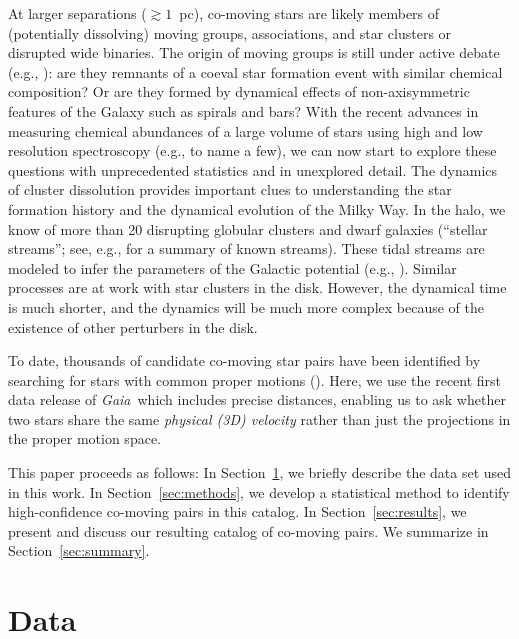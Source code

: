 \documentclass[manuscript, letterpaper]{aastex6}
\newcommand{\project}[1]{\textsl{#1}}
\newcommand{\gaia}{\project{Gaia}}
\newcommand{\sectionname}{Section}
\begin{document}
At larger separations ($\gtrsim 1$~pc), co-moving stars are likely members of
(potentially dissolving) moving groups, associations, and star clusters or
disrupted wide binaries.
The origin of moving groups is still under active debate (e.g., \citealt{Bovy:2010aa}):
are they remnants of a coeval
star formation event with similar chemical composition? Or are they formed by
dynamical effects of non-axisymmetric features of the Galaxy such as spirals
and bars? With the recent advances in measuring chemical abundances of
a large volume of stars using high and low resolution spectroscopy
(e.g., \citealt{Steinmetz:2006aa,Majewski:2015aa,Gilmore:2012aa} to name a few),
we can now start to explore these questions
with unprecedented statistics and in unexplored detail.
The dynamics of cluster dissolution provides important clues to understanding
the star formation history and the dynamical evolution of the Milky Way.
In the halo, we know of more than 20 disrupting globular clusters and dwarf galaxies
(``stellar streams''; see, e.g., \citealt{Grillmair:2016} for a summary of known streams).
These tidal streams are modeled to infer the parameters of the Galactic
potential (e.g., \citealt{Kupper:2015}).
Similar processes are at work with star clusters in the disk.
However, the dynamical time is much shorter, and the dynamics will be much more
complex because of the existence of other perturbers in the disk.

To date, thousands of candidate co-moving star pairs have been identified by
searching for stars with common proper motions
(\citealt{Poveda:1994aa,Allen:2000aa,Chaname:2004aa,
Lepine:2007aa,Shaya:2011aa,Alonso-Floriano:2015aa}).
Here, we use the recent first data release of \gaia\ which includes precise distances,
enabling us to ask whether two stars share the same \emph{physical (3D) velocity} rather than
just the projections in the proper motion space.

This paper proceeds as follows:
In \sectionname~\ref{sec:data}, we briefly describe the data set used in
this work.
In \sectionname~\ref{sec:methods}, we develop a statistical method to identify
high-confidence co-moving pairs in this catalog.
In \sectionname~\ref{sec:results}, we present and discuss our resulting catalog
of co-moving pairs.
We summarize in \sectionname~\ref{sec:summary}.


\section{Data} \label{sec:data}
\end{document}
